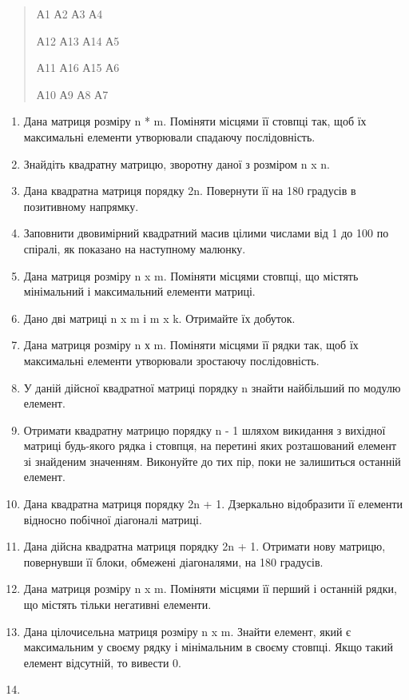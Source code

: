 \documentclass[]{article}
\begin{document}
\begin{quote}
А1 А2 А3 А4

А12 А13 А14 А5

А11 А16 А15 А6

А10 А9 А8 А7
\end{quote}

\begin{enumerate}
\def\labelenumi{\arabic{enumi})}
\item
  Дана матриця розміру n * m. Поміняти місцями її стовпці так, щоб їх
  максимальні елементи утворювали спадаючу послідовність.
\item
  Знайдіть квадратну матрицю, зворотну даної з розміром n x n.
\item
  Дана квадратна матриця порядку 2n. Повернути її на 180 градусів в
  позитивному напрямку.
\item
  Заповнити двовимірний квадратний масив цілими числами від 1 до 100 по
  спіралі, як показано на наступному малюнку.
\item
  Дана матриця розміру n x m. Поміняти місцями стовпці, що містять
  мінімальний і максимальний елементи матриці.
\item
  Дано дві матриці n x m і m x k. Отримайте їх добуток.
\item
  Дана матриця розміру n х m. Поміняти місцями її рядки так, щоб їх
  максимальні елементи утворювали зростаючу послідовність.
\item
  У даній дійсної квадратної матриці порядку n знайти найбільший по
  модулю елемент.
\item
  Отримати квадратну матрицю порядку n - 1 шляхом викидання з вихідної
  матриці будь-якого рядка і стовпця, на перетині яких розташований
  елемент зі знайденим значенням. Виконуйте до тих пір, поки не
  залишиться останній елемент.
\item
  Дана квадратна матриця порядку 2n + 1. Дзеркально відобразити її
  елементи відносно побічної діагоналі матриці.
\item
  Дана дійсна квадратна матриця порядку 2n + 1. Отримати нову матрицю,
  повернувши її блоки, обмежені діагоналями, на 180 градусів.
\item
  Дана матриця розміру n x m. Поміняти місцями її перший і останній
  рядки, що містять тільки негативні елементи.
\item
  Дана цілочисельна матриця розміру n x m. Знайти елемент, який є
  максимальним у своєму рядку і мінімальним в своєму стовпці. Якщо такий
  елемент відсутній, то вивести 0.
\item

\end{enumerate}
\end{document}
